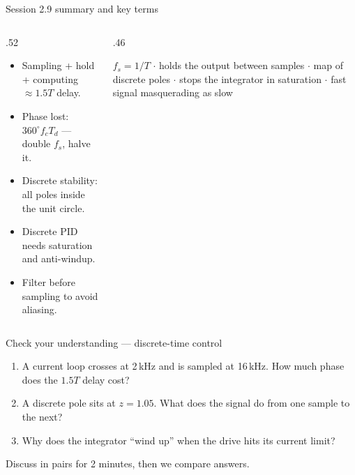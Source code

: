 \documentclass[aspectratio=169,10pt]{beamer}
\begin{document}
\begin{frame}{Session 2.9 summary and key terms}
\begin{columns}[T]
\begin{column}{.52\textwidth}
\begin{keybox}
\begin{itemize}\setlength\itemsep{.4mm}
\item Sampling + hold + computing $\approx1.5T$ delay.
\item Phase lost: $360^\circ f_cT_d$ --- double $f_s$, halve it.
\item Discrete stability: all poles inside the unit circle.
\item Discrete PID needs saturation and anti-windup.
\item Filter before sampling to avoid aliasing.
\end{itemize}
\end{keybox}
\end{column}
\begin{column}{.46\textwidth}
\begin{defbox}
\small
{} $f_s=1/T$ $\cdot$  holds the output between samples $\cdot$  map of discrete poles $\cdot$  stops the integrator in saturation $\cdot$  fast signal masquerading as slow
\end{defbox}
\end{column}
\end{columns}
\end{frame}

\begin{frame}{Check your understanding --- discrete-time control}
\begin{keybox}
\begin{enumerate}\setlength\itemsep{2mm}
\item A current loop crosses at 2\,kHz and is sampled at 16\,kHz. How much phase does the $1.5T$ delay cost?
\item A discrete pole sits at $z=1.05$. What does the signal do from one sample to the next?
\item Why does the integrator ``wind up'' when the drive hits its current limit?
\end{enumerate}
\end{keybox}
\vspace{2mm}
{\small\color{mkGray}Discuss in pairs for 2 minutes, then we compare answers.}
\end{frame}
\end{document}
